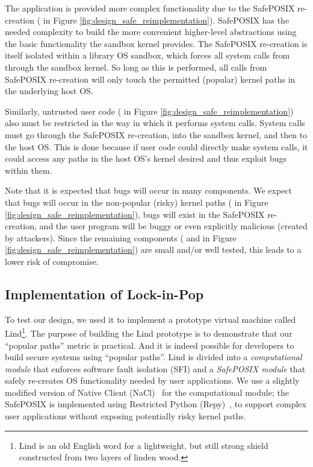 The application is provided more complex functionality due to the SafePOSIX re-creation
( in Figure \ref{fig:design_safe_reimplementation}).
SafePOSIX has the needed complexity to build the more convenient higher-level
abstractions using the basic functionality the sandbox kernel provides.
The SafePOSIX re-creation is itself isolated within a library OS sandbox, which
forces all system calls from through the sandbox kernel.
So long as this is performed, all calls from SafePOSIX re-creation will only touch the permitted (popular) kernel paths in the underlying host OS.

Similarly, untrusted user code ( in Figure \ref{fig:design_safe_reimplementation}) also must be restricted in the way
in which it performs system calls.
System calls must go through the SafePOSIX re-creation, into the sandbox kernel, and then to the host OS.
This is done because if user code could directly make system calls, it could access any paths in the host OS's kernel desired
and thus exploit bugs within them.

Note that it is expected that bugs will occur in many components.
We expect that bugs will occur in the non-popular (risky) kernel paths ( in Figure \ref{fig:design_safe_reimplementation}),
bugs will exist in the SafePOSIX re-creation, and the user program will be buggy or even explicitly malicious (created by attackers).
Since the remaining components ( and  in Figure \ref{fig:design_safe_reimplementation})
are small and/or well tested, this leads to a lower risk of compromise.

\subsection{Implementation of Lock-in-Pop}

To test our \lip design, we used it to implement a prototype virtual machine
called Lind\footnote{\scriptsize Lind is an old English word for a lightweight, but still strong shield
constructed from two layers of linden wood.}. The purpose of building the Lind prototype is to demonstrate that 
our ``popular paths'' metric is practical. And it is indeed possible for developers to build secure systems using 
``popular paths''. 
Lind is divided into a \emph{computational module} that enforces software fault isolation (SFI) and a
\emph{SafePOSIX module} that safely re-creates OS functionality needed by user
applications.  We use a slightly modified version of Native Client
(NaCl)~\cite{NaCl-09} for the computational module; the SafePOSIX is
implemented using Restricted Python (Repy)~\cite{Repy-10}, to support
complex user applications without exposing potentially risky kernel paths.


